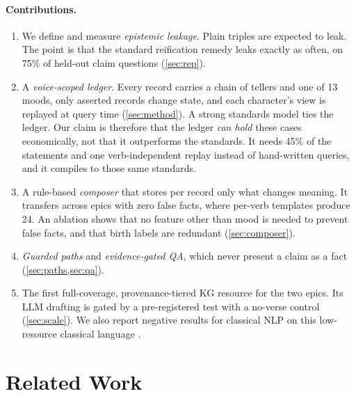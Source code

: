 \documentclass[11pt]{article}
\begin{document}
\paragraph{Contributions.}
\begin{enumerate}
\item We define and measure \emph{epistemic leakage}. Plain triples are expected to leak. The point is that the standard reification remedy leaks exactly as often, on 75\% of held-out claim questions (\cref{sec:rep}).
\item A \emph{voice-scoped ledger}. Every record carries a chain of tellers and one of 13 moods, only asserted records change state, and each character's view is replayed at query time (\cref{sec:method}). A strong standards model ties the ledger. Our claim is therefore that the ledger \emph{can hold} these cases economically, not that it outperforms the standards. It needs 45\% of the statements and one verb-independent replay instead of hand-written queries, and it compiles to those same standards.
\item A rule-based \emph{composer} that stores per record only what changes meaning. It transfers across epics with zero false facts, where per-verb templates produce 24. An ablation shows that no feature other than mood is needed to prevent false facts, and that birth labels are redundant (\cref{sec:composer}).
\item \emph{Guarded paths} and \emph{evidence-gated QA}, which never present a claim as a fact (\cref{sec:paths,sec:qa}).
\item The first full-coverage, provenance-tiered KG resource for the two epics. Its LLM drafting is gated by a pre-registered test with a no-verse control (\cref{sec:scale}). We also report negative results for classical NLP on this low-resource classical language \citep{Joshi2020StateFate}.
\end{enumerate}

\section{Related Work}
\label{sec:related}
\end{document}
